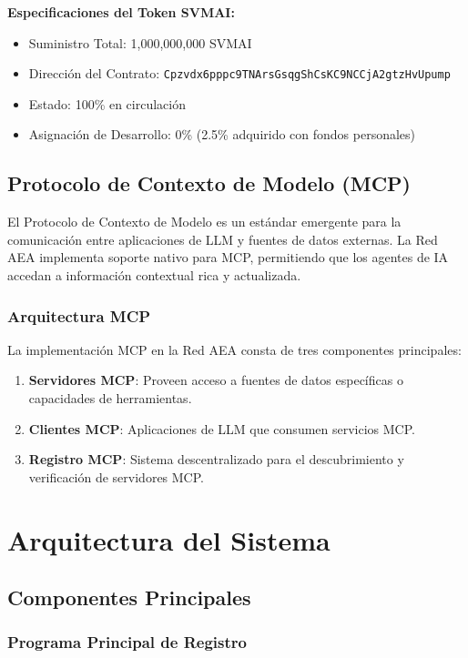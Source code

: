 \documentclass[12pt,a4paper]{article}
\begin{document}
\textbf{Especificaciones del Token SVMAI:}
\begin{itemize}
\item Suministro Total: 1,000,000,000 SVMAI
\item Dirección del Contrato: \texttt{Cpzvdx6pppc9TNArsGsqgShCsKC9NCCjA2gtzHvUpump}
\item Estado: 100\% en circulación
\item Asignación de Desarrollo: 0\% (2.5\% adquirido con fondos personales)
\end{itemize}

\subsection{Protocolo de Contexto de Modelo (MCP)}

El Protocolo de Contexto de Modelo es un estándar emergente para la comunicación entre aplicaciones de LLM y fuentes de datos externas. La Red AEA implementa soporte nativo para MCP, permitiendo que los agentes de IA accedan a información contextual rica y actualizada.

\subsubsection{Arquitectura MCP}

La implementación MCP en la Red AEA consta de tres componentes principales:

\begin{enumerate}
\item \textbf{Servidores MCP}: Proveen acceso a fuentes de datos específicas o capacidades de herramientas.
\item \textbf{Clientes MCP}: Aplicaciones de LLM que consumen servicios MCP.
\item \textbf{Registro MCP}: Sistema descentralizado para el descubrimiento y verificación de servidores MCP.
\end{enumerate}

\section{Arquitectura del Sistema}

\subsection{Componentes Principales}

\subsubsection{Programa Principal de Registro}
\end{document}
